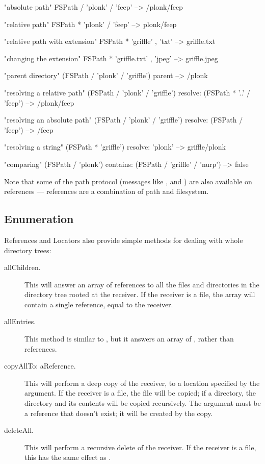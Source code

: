 \documentclass[a4paper,10pt,twoside]{book}
\begin{document}
\begin{code}{}
"absolute path"
FSPath / 'plonk' / 'feep'       --> /plonk/feep
    
"relative path"
FSPath * 'plonk' / 'feep'       --> plonk/feep

"relative path with extension"
FSPath * 'griffle' , 'txt'      --> griffle.txt
    
"changing the extension"
FSPath * 'griffle.txt' , 'jpeg'     --> griffle.jpeg
    
"parent directory"
(FSPath / 'plonk' / 'griffle') parent   --> /plonk
    
"resolving a relative path"
(FSPath / 'plonk' / 'griffle') resolve: (FSPath * '..' / 'feep')
                   --> /plonk/feep
    
"resolving an absolute path"
(FSPath / 'plonk' / 'griffle') resolve: (FSPath / 'feep')
                   --> /feep
                                           
"resolving a string"
(FSPath * 'griffle') resolve: 'plonk'   --> griffle/plonk
                        
"comparing"
(FSPath / 'plonk') contains: (FSPath / 'griffle' / 'nurp')
                     --> false
\end{code}

Note that some of the path protocol (messages like \ct{/},  and ) are also available on references --- references are a combination of path and filesystem. 

\subsection{Enumeration}

References and Locators also provide simple methods for dealing with whole directory trees:

\begin{description}
\item[allChildren.]

This will answer an array of references to all the files and directories in the directory tree rooted at the receiver. If the receiver is a file, the array will contain a single reference, equal to the receiver.

\item[allEntries.]
This method is similar to , but it answers an array of , rather than references.

\item[copyAllTo: aReference.]

This will perform a deep copy of the receiver, to a location specified by the argument. If the receiver is a file, the file will be copied; if a directory, the directory and its contents will be copied recursively. The argument must be a reference that doesn't exist; it will be created by the copy.

\item[deleteAll.]

This will perform a recursive delete of the receiver. If the receiver is a file, this has the same effect as .
\end{description}
\end{document}
